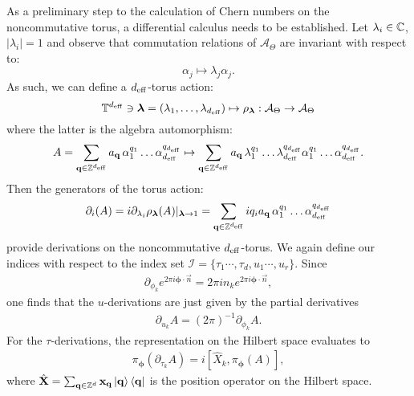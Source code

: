 \documentclass[
    aps,
    prb,
    twocolumn,
    floatfix,
    superscriptaddress,
	10pt
]{revtex4-2}
\begin{document}
As a preliminary step to the calculation of Chern numbers on the noncommutative torus, a differential calculus needs to be established.
Let $\lambda_i \in {\mathbb C}$, $|\lambda_i| =1$ and observe that commutation relations of $\mathcal{A}_\Theta$ are invariant with respect to:
\begin{equation}
\alpha_j \mapsto \lambda_j \alpha_j.
\end{equation}
As such, we can define a ${d_\mathrm{eff}}$-torus action:
\begin{equation}
{\mathbb T}^{d_\mathrm{eff}} \ni \bm \lambda=(\lambda_1,\ldots,\lambda_{d_\mathrm{eff}}) \mapsto \rho_{\bm \lambda}: \mathcal{A}_\Theta \to \mathcal{A}_\Theta
\end{equation}
where the latter is the algebra automorphism:
\begin{equation}
	A = \sum_{\mathbf{q} \in {\mathbb Z}^{{d_\mathrm{eff}}}} a_{\mathbf{q}}
	\, \alpha_1^{q_1} \ldots\alpha_{d_\mathrm{eff}}^{q_{d_\mathrm{eff}}}
	\mapsto  
	\sum_{\mathbf{q} \in {\mathbb Z}^{{d_\mathrm{eff}}}} a_{\mathbf{q}}
	\, 
	\lambda_1^{q_1} \ldots\lambda_{d_\mathrm{eff}}^{q_{d_\mathrm{eff}}}
	\alpha_1^{q_1} \ldots\alpha_{d_\mathrm{eff}}^{q_{d_\mathrm{eff}}} .
\end{equation}
Then the generators of the torus action:
\begin{equation}
\partial_i(A) = i \partial_{\lambda_i} \rho_{\bm \lambda}(A)|_{\bm \lambda \rightarrow 1}
=\sum_{\mathbf{q} \in {\mathbb Z}^{{d_\mathrm{eff}}}} i q_i a_{\mathbf{q}}
\, \alpha_1^{q_1} \ldots\alpha_{d_\mathrm{eff}}^{q_{d_\mathrm{eff}}}
\end{equation}
provide derivations on the noncommutative ${d_\mathrm{eff}}$-torus. 
We again define our indices with respect to the index set $\mathcal{I} = \lbrace \tau_1 \cdots, \tau_d, u_1  \cdots, u_r  \rbrace$.
Since
\begin{align}
	\partial_{\phi_k}  e^{2\pi i \boldsymbol{\phi} \cdot \vec{n}} = 2\pi  i n_k  e^{2 \pi i \boldsymbol{\phi} \cdot \vec{n}},
\end{align}
one finds that the $u$-derivations are just given by the partial derivatives
\begin{align}
	\partial_{u_k}  A 
	=  (2\pi)^{-1}\partial_{\phi_k}  A. 
\end{align}
For the $\tau$-derivations, the representation on the Hilbert space evaluates to
\begin{align}
	\pi_{\boldsymbol{\phi}} (\partial_{\tau_k} A) = i [ \hat{X}_k, \pi_{\boldsymbol{\phi}} (A)],
\end{align}
where $\hat{\mathbf{X}} = \sum_{\mathbf{q}\in \mathbb{Z}^d} \mathbf{x}_{\mathbf{q}}\ket{\mathbf{q}} \bra{\mathbf{q}}$ is the position operator on the Hilbert space.
\end{document}
